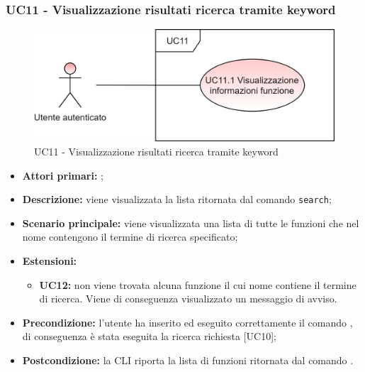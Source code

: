 \subsubsection{UC11 - Visualizzazione risultati ricerca tramite keyword}
\begin{figure}[H]
	\centering
	\includegraphics[scale=\ucs]{./res/img/UC11.png}
	\caption {UC11 - Visualizzazione risultati ricerca tramite keyword}
\end{figure}
\begin{itemize}
	\item \textbf{Attori primari:} \ua{};
	\item \textbf{Descrizione:} viene visualizzata la lista ritornata dal comando \texttt{search};
	\item \textbf{Scenario principale:} viene visualizzata una lista di tutte le funzioni che nel nome contengono il termine di ricerca specificato;
	\item \textbf{Estensioni:} 
	\begin{itemize}
		\item \textbf{UC12:} non viene trovata alcuna funzione il cui nome contiene il termine di ricerca. Viene di conseguenza visualizzato un messaggio di avviso.
	\end{itemize}
	\item \textbf{Precondizione:} l’utente ha inserito ed eseguito correttamente il comando \search{}, di conseguenza è stata eseguita la ricerca richiesta [UC10];
	\item \textbf{Postcondizione:} la CLI riporta la lista di funzioni ritornata dal comando \search{}.
\end{itemize}